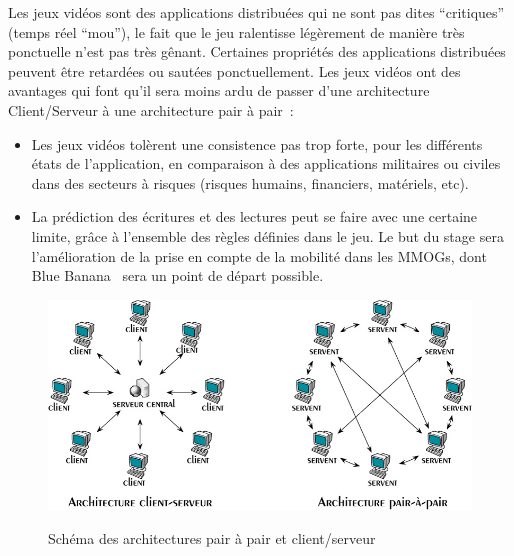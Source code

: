 	\par Les jeux vidéos sont des applications distribuées qui ne sont pas dites ``critiques'' (temps réel ``mou''), le fait que le jeu ralentisse légèrement de manière très ponctuelle n'est pas très gênant. Certaines propriétés des applications distribuées peuvent être retardées ou sautées ponctuellement. Les jeux vidéos ont des avantages qui font qu'il sera moins ardu de passer d'une architecture Client/Serveur à une architecture pair à pair~\cite{1267692}:
	\begin{itemize}
		\renewcommand{\labelitemi}{$\bullet$}
		\item Les jeux vidéos tolèrent une consistence pas trop forte, pour les différents états de l'application, en comparaison à des applications militaires ou civiles dans des secteurs à risques (risques humains, financiers, matériels, etc).
		\item La prédiction des écritures et des lectures peut se faire avec une certaine limite, grâce à l'ensemble des règles définies dans le jeu. Le but du stage sera l'amélioration de la prise en compte de la mobilité dans les MMOGs, dont Blue Banana~\cite{191} sera un point de départ possible.
	\end{itemize}
	\vspace{1cm}
	\begin{figure}[!h]
	\centering
	\includegraphics[scale=0.45]{./Ressources/Images/p2p-85145.png}\\
	\caption{Schéma des architectures pair à pair et client/serveur}
	\label{P2P/ClServ}
	\end{figure} 
\newpage
